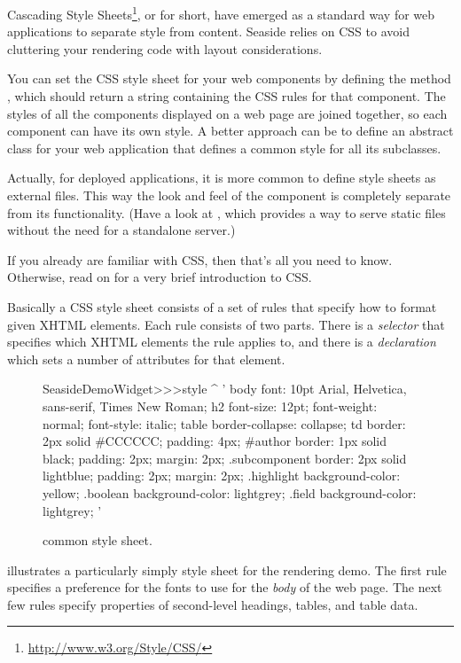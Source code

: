 \documentclass[a4paper,10pt,twoside]{book}
\begin{document}
Cascading Style Sheets\footnote{\url{http://www.w3.org/Style/CSS/}}, or  for short, have emerged as a standard way for web applications to separate style from content.
Seaside relies on CSS to avoid cluttering your rendering code with layout considerations.

You can set the CSS style sheet for your web components by defining the method , which should return a string containing the CSS rules for that component.
The styles of all the components displayed on a web page are joined together, so each component can have its own style.
A better approach can be to define an abstract class for your web application that defines a common style for all its subclasses.

Actually, for deployed applications, it is more common to define style sheets as external files.
This way the look and feel of the component is completely separate from its functionality.
(Have a look at , which provides a way to serve static files without the need for a standalone server.)

If you already are familiar with CSS, then that's all you need to know.
Otherwise, read on for a very brief introduction to CSS.

Basically a CSS style sheet consists of a set of rules that specify how to format given XHTML elements.
Each rule consists of two parts.
There is a \emph{selector} that specifies which XHTML elements the rule applies to, and there is a \emph{declaration} which sets a number of attributes for that element.

\begin{figure}[tb]
\begin{code}{}
SeasideDemoWidget>>>style
	^ '
body {
	font: 10pt Arial, Helvetica, sans-serif, Times New Roman;
}
h2 {
	font-size: 12pt;
	font-weight: normal;
	font-style: italic;
}
table { border-collapse: collapse; }
td {
	border: 2px solid #CCCCCC;
	padding: 4px;
}
#author {
	border: 1px solid black;
	padding: 2px;
	margin: 2px;
}
.subcomponent {
	border: 2px solid lightblue;
	padding: 2px;
	margin: 2px;
}
.highlight { background-color: yellow; }
.boolean { background-color: lightgrey; }
.field { background-color: lightgrey; }
'
\end{code}
\caption{ common style sheet.
\label{fig:democss}}
\end{figure}
 illustrates a particularly simply style sheet for the rendering demo.
The first rule specifies a preference for the fonts to use for the \emph{body} of the web page.
The next few rules specify properties of second-level headings, tables, and table data.
\end{document}
